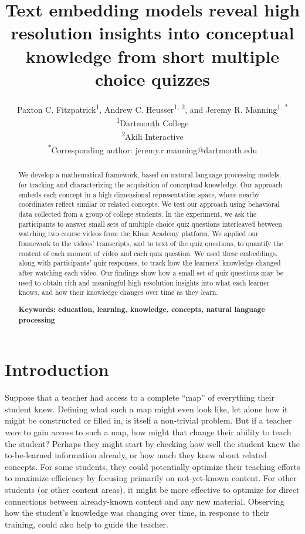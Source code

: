 \documentclass[10pt]{article}
\title{Text embedding models reveal high resolution insights into conceptual
knowledge from short multiple choice quizzes}
\author{Paxton C. Fitzpatrick\textsuperscript{1},
Andrew C. Heusser\textsuperscript{1, 2}, and Jeremy R.
Manning\textsuperscript{1, *}\\\textsuperscript{1}Dartmouth
College\\\textsuperscript{2}Akili Interactive\\\textsuperscript{*}Corresponding author:
jeremy.r.manning@dartmouth.edu}
\date{}
\begin{document}
\maketitle

\begin{abstract} We develop a mathematical framework, based on natural language
processing models, for tracking and characterizing the acquisition of
conceptual knowledge. Our approach embeds each concept in a high dimensional
representation space, where nearby coordinates reflect similar or related
concepts. We test our approach using behavioral data collected from a group of
college students. In the experiment, we ask the participants to answer small
sets of multiple choice quiz questions interleaved between watching two course
videos from the Khan Academy platform. We applied our framework to the videos'
transcripts, and to text of the quiz questions, to quantify the content of each
moment of video and each quiz question. We used these embeddings, along with
participants' quiz responses, to track how the learners' knowledge changed
after watching each video. Our findings show how a small set of quiz questions
may be used to obtain rich and meaningful high resolution insights into what
each learner knows, and how their knowledge changes over time as they learn.

\textbf{Keywords: education, learning, knowledge, concepts, natural language processing}

\end{abstract}


\section*{Introduction}

Suppose that a teacher had access to a complete ``map'' of everything their
student knew. Defining what such a map might even look like, let alone how it
might be constructed or filled in, is itself a non-trivial problem. But if a
teacher \textit{were} to gain access to such a map, how might that change their
ability to teach the student? Perhaps they might start by checking how well the
student knew the to-be-learned information already, or how much they knew about
related concepts. For some students, they could potentially optimize their
teaching efforts to maximize efficiency by focusing primarily on not-yet-known
content. For other students (or other content areas), it might be more
effective to optimize for direct connections between already-known content and
any new material. Observing how the student's knowledge was changing over time,
in response to their training, could also help to guide the teacher.
\end{document}
